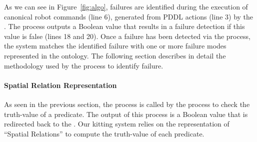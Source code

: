 As we can see in Figure~\ref{fig:algo}, failures are identified during the execution of 
canonical robot commands (line 6), generated from PDDL actions (line 3) by the . 
The  process outputs a Boolean value that results in a 
failure detection if this value is false (lines 18 and 20). Once a failure has been 
detected via the  process, the system matches the 
identified failure with one or more failure modes represented in the ontology. The 
following section describes in detail the methodology used by the  
process to identify failure.


\paragraph{Spatial Relation Representation}
As seen in the previous section, the  process is called by 
the  process to check the truth-value of a predicate. The output 
of this process is a Boolean value that is redirected back to the . 
Our kitting system relies on the representation of ``Spatial Relations'' 
to compute the truth-value of each predicate.

